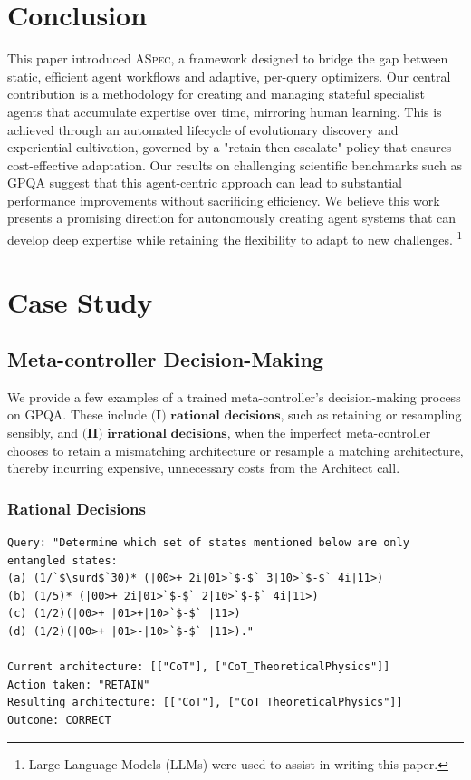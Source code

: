 \documentclass{article} %
\begin{document}
\section{Conclusion}
This paper introduced \textsc{ASpec}, a framework designed to bridge the gap between static, efficient agent workflows and adaptive, per-query optimizers. Our central contribution is a methodology for creating and managing stateful specialist agents that accumulate expertise over time, mirroring human learning. This is achieved through an automated lifecycle of evolutionary discovery and experiential cultivation, governed by a "retain-then-escalate" policy that ensures cost-effective adaptation. Our results on challenging scientific benchmarks such as GPQA suggest that this agent-centric approach can lead to substantial performance improvements without sacrificing efficiency. We believe this work presents a promising direction for autonomously creating agent systems that can develop deep expertise while retaining the flexibility to adapt to new challenges. \footnote{Large Language Models (LLMs) were used to assist in writing this paper.}
\newpage





\clearpage
\appendix

\section{Case Study}
\subsection{Meta-controller Decision-Making}
\label{app:controller_probe}

We provide a few examples of a trained meta-controller's decision-making process on GPQA. These include \(\textbf{(I) rational decisions}\), such as retaining or resampling sensibly, and \(\textbf{(II) irrational decisions}\), when the imperfect meta-controller chooses to retain a mismatching architecture or resample a matching architecture, thereby incurring expensive, unnecessary costs from the Architect call. 

\subsubsection{Rational Decisions}



\begin{lstlisting}[style=customxml]
Query: "Determine which set of states mentioned below are only entangled states:
(a) (1/`$\surd$`30)* (|00>+ 2i|01>`$-$` 3|10>`$-$` 4i|11>)
(b) (1/5)* (|00>+ 2i|01>`$-$` 2|10>`$-$` 4i|11>)
(c) (1/2)(|00>+ |01>+|10>`$-$` |11>)
(d) (1/2)(|00>+ |01>-|10>`$-$` |11>)."

Current architecture: [["CoT"], ["CoT_TheoreticalPhysics"]]
Action taken: "RETAIN"
Resulting architecture: [["CoT"], ["CoT_TheoreticalPhysics"]]
Outcome: CORRECT
\end{lstlisting}
\end{document}
